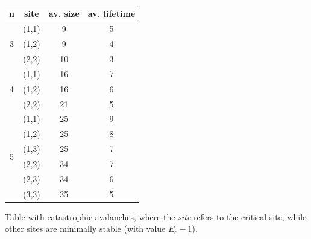 \begin{center}
\begin{tabular}{|c|c|c|c|}
 \hline
 n                  & site  & av. size & av. lifetime\\\hline
 \multirow{3}{*}{3} & (1,1) & 9        & 5 \\ \hline
                    & (1,2) & 9        & 4 \\ \hline
                    & (2,2) & 10       & 3 \\ \hline
 \multirow{3}{*}{4} & (1,1) & 16       & 7 \\ \hline
                    & (1,2) & 16       & 6 \\ \hline
                    & (2,2) & 21       & 5 \\ \hline
 \multirow{6}{*}{5} & (1,1) & 25       & 9 \\ \hline
                    & (1,2) & 25       & 8 \\ \hline
                    & (1,3) & 25       & 7 \\ \hline
                    & (2,2) & 34       & 7 \\ \hline 
                    & (2,3) & 34       & 6 \\ \hline
                    & (3,3) & 35       & 5 \\ \hline
\end{tabular}
\caption{Table with catastrophic avalanches, where the \emph{site} refers to the critical site, while other sites are minimally stable (with value $E_c-1$).}
\label{tabn2}
\end{center} 